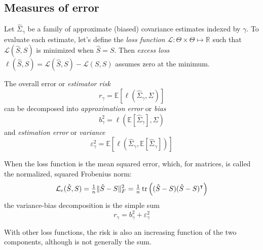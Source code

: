 \subsection{Measures of error}
Let $\hat\Sigma_\gamma$ be a family of approximate (biased) covariance estimates indexed by $\gamma$. To evaluate each estimate, let's define the \emph{loss function} $\mathcal L : \Theta \times \Theta \mapsto \mathbb R$ such that $\mathcal L(\hat S,S)$ is minimized when $\hat S = S$.  Then \emph{excess loss} $\ell(\hat S, S) = \mathcal L(\hat S, S) - \mathcal L(S,S)$ assumes zero at the minimum. 

The overall error or \emph{estimator risk} 
\begin{equation}
r_\gamma = \mathbb E\left[ \ell\left(\hat\Sigma_\gamma,\Sigma\right) \right]
\end{equation}
can be decomposed into \emph{approximation error} or \emph{bias}   
\begin{equation}
b_\gamma^2 = \ell \left( \mathbb E\left[\hat \Sigma_\gamma\right],\Sigma\right)
\end{equation}
and \emph{estimation error} or \emph{variance}
\begin{equation}
\varepsilon_\gamma^2 = \mathbb E \left[ \ell\left(\hat \Sigma_\gamma, 
\mathbb E\left[\hat \Sigma_\gamma\right]\right) \right]
\end{equation}

When the loss function is the mean squared error, which, for matrices, is called the normalized, squared Frobenius norm: 
\begin{equation}
\mathcal L_e(\hat S,S) =\tfrac 1 n \|\hat S-S\|_F^2 = \tfrac 1 n \operatorname{tr}\left((\hat S-S)(\hat S-S)^\intercal\right)
\end{equation}
the variance-bias decomposition is the simple sum
\begin{equation}
r_\gamma =  b_\gamma^2 + \varepsilon_\gamma^2
\end{equation}

With other loss functions, the risk is also an increasing function of the two components, although is not generally the sum.

